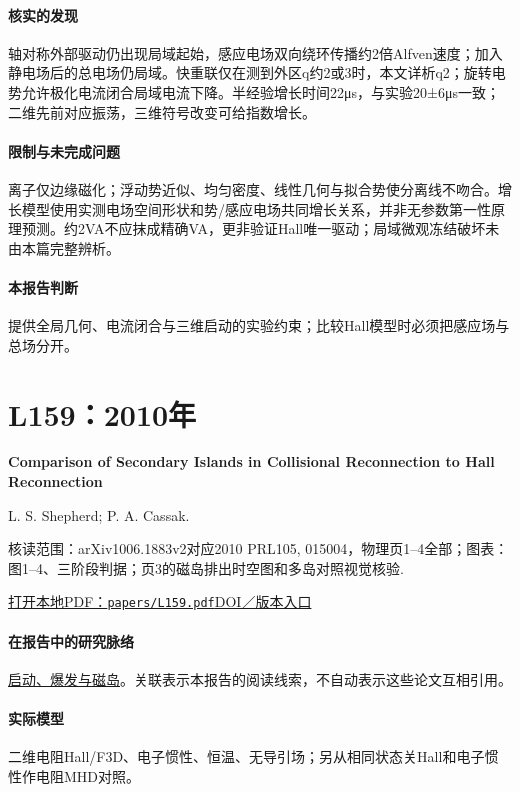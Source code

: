 \documentclass[UTF8,a4paper,11pt,openany,fontset=fandol]{ctexbook}
\begin{document}
\paragraph{核实的发现}轴对称外部驱动仍出现局域起始，感应电场双向绕环传播约2倍Alfven速度；加入静电场后的总电场仍局域。快重联仅在测到外区q约2或3时，本文详析q2；旋转电势允许极化电流闭合局域电流下降。半经验增长时间22μs，与实验20±6μs一致；二维先前对应振荡，三维符号改变可给指数增长。

\paragraph{限制与未完成问题}离子仅边缘磁化；浮动势近似、均匀密度、线性几何与拟合势使分离线不吻合。增长模型使用实测电场空间形状和势/感应电场共同增长关系，并非无参数第一性原理预测。约2VA不应抹成精确VA，更非验证Hall唯一驱动；局域微观冻结破坏未由本篇完整辨析。

\paragraph{本报告判断}提供全局几何、电流闭合与三维启动的实验约束；比较Hall模型时必须把感应场与总场分开。

\section{L159：2010年}\label{paper:L159}

\textbf{Comparison of Secondary Islands in Collisional Reconnection to Hall Reconnection}\citep{L159}\

L. S. Shepherd;  P. A. Cassak.

\textsf{核读范围：}arXiv1006.1883v2对应2010 PRL105, 015004，物理页1–4全部；\textsf{图表：}图1–4、三阶段判据；页3的磁岛排出时空图和多岛对照视觉核验.

\href{run:../papers/L159.pdf}{打开本地PDF：\texttt{papers/L159.pdf}}\quad\href{https://doi.org/10.1103/physrevlett.105.015004}{DOI／版本入口}

\paragraph{在报告中的研究脉络}\hyperref[story:onset]{启动、爆发与磁岛}。关联表示本报告的阅读线索，不自动表示这些论文互相引用。

\paragraph{实际模型}二维电阻Hall/F3D、电子惯性、恒温、无导引场；另从相同状态关Hall和电子惯性作电阻MHD对照。
\end{document}
